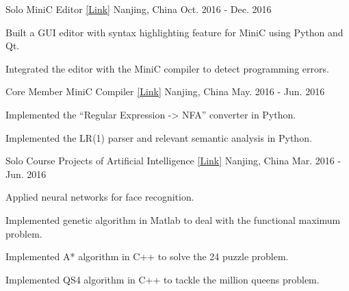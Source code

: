 

\begin{cventries}

  \cventry
    {Solo} %
    {MiniC Editor \href{https://github.com/yanshengjia/nucleon}{[\underline{Link}]}} %
    {Nanjing, China} %
    {Oct. 2016 - Dec. 2016} %
    {
      \begin{cvitems} %
        \item {Built a GUI editor with syntax highlighting feature for MiniC using Python and Qt.}
        \item {Integrated the editor with the MiniC compiler to detect programming errors.}
      \end{cvitems}
    }

  \cventry
    {Core Member} %
    {MiniC Compiler \href{https://github.com/yanshengjia/compiler}{[\underline{Link}]}} %
    {Nanjing, China} %
    {May. 2016 - Jun. 2016} %
    {
      \begin{cvitems} %
        \item {Implemented the ``Regular Expression -> NFA'' converter in Python.}
        \item {Implemented the LR(1) parser and relevant semantic analysis in Python.}
      \end{cvitems}
    }

  \cventry
    {Solo} %
    {Course Projects of Artificial Intelligence \href{https://github.com/yanshengjia/artificial-intelligence}{[\underline{Link}]}} %
    {Nanjing, China} %
    {Mar. 2016 - Jun. 2016} %
    {
      \begin{cvitems} %
        \item {Applied neural networks for face recognition.}
        \item {Implemented genetic algorithm in Matlab to deal with the functional maximum problem.}
        \item {Implemented A* algorithm in C++ to solve the 24 puzzle problem.}
        \item {Implemented QS4 algorithm in C++ to tackle the million queens problem.}
      \end{cvitems}
    }


\end{cventries}
